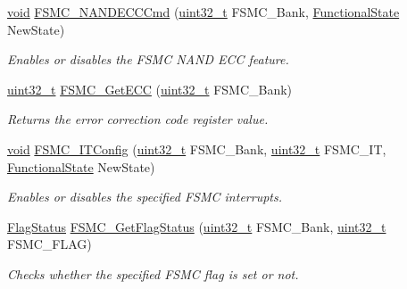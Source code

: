 \begin{DoxyCompactItemize}
\hyperlink{usb__devapi_8h_afabf60e7f57651d6d595a02c75f07cd0}{void} \hyperlink{group___f_s_m_c___exported___functions_ga5800301fc39bbe998a18ebd9ff191cdc}{F\+S\+M\+C\+\_\+\+N\+A\+N\+D\+E\+C\+C\+Cmd} (\hyperlink{_p_e___types_8h_a33594304e786b158f3fb30289278f5af}{uint32\+\_\+t} F\+S\+M\+C\+\_\+\+Bank, \hyperlink{agilefox_2library_2inc_2stm32f10x__type_8h_ac9a7e9a35d2513ec15c3b537aaa4fba1}{Functional\+State} New\+State)
\begin{DoxyCompactList}\small\item\em Enables or disables the F\+S\+MC N\+A\+ND E\+CC feature. \end{DoxyCompactList}\item 
\hyperlink{_p_e___types_8h_a33594304e786b158f3fb30289278f5af}{uint32\+\_\+t} \hyperlink{group___f_s_m_c___exported___functions_gaad6d4f5b5a41684ce053fea55bdb98d8}{F\+S\+M\+C\+\_\+\+Get\+E\+CC} (\hyperlink{_p_e___types_8h_a33594304e786b158f3fb30289278f5af}{uint32\+\_\+t} F\+S\+M\+C\+\_\+\+Bank)
\begin{DoxyCompactList}\small\item\em Returns the error correction code register value. \end{DoxyCompactList}\item 
\hyperlink{usb__devapi_8h_afabf60e7f57651d6d595a02c75f07cd0}{void} \hyperlink{group___f_s_m_c___exported___functions_ga217027ae3cd213b9076b6a1be197064c}{F\+S\+M\+C\+\_\+\+I\+T\+Config} (\hyperlink{_p_e___types_8h_a33594304e786b158f3fb30289278f5af}{uint32\+\_\+t} F\+S\+M\+C\+\_\+\+Bank, \hyperlink{_p_e___types_8h_a33594304e786b158f3fb30289278f5af}{uint32\+\_\+t} F\+S\+M\+C\+\_\+\+IT, \hyperlink{agilefox_2library_2inc_2stm32f10x__type_8h_ac9a7e9a35d2513ec15c3b537aaa4fba1}{Functional\+State} New\+State)
\begin{DoxyCompactList}\small\item\em Enables or disables the specified F\+S\+MC interrupts. \end{DoxyCompactList}\item 
\hyperlink{agilefox_2library_2inc_2stm32f10x__type_8h_a89136caac2e14c55151f527ac02daaff}{Flag\+Status} \hyperlink{group___f_s_m_c___exported___functions_gae00355115b078f483f0771057bb849c4}{F\+S\+M\+C\+\_\+\+Get\+Flag\+Status} (\hyperlink{_p_e___types_8h_a33594304e786b158f3fb30289278f5af}{uint32\+\_\+t} F\+S\+M\+C\+\_\+\+Bank, \hyperlink{_p_e___types_8h_a33594304e786b158f3fb30289278f5af}{uint32\+\_\+t} F\+S\+M\+C\+\_\+\+F\+L\+AG)
\begin{DoxyCompactList}\small\item\em Checks whether the specified F\+S\+MC flag is set or not. \end{DoxyCompactList}\item 

\end{DoxyCompactItemize}

